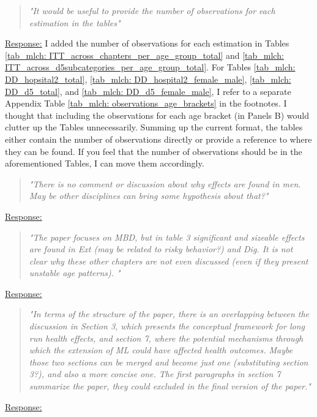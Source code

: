 \begin{quote}
	\textit{"It  would be useful to provide the number of observations for each estimation in the tables"}
\end{quote}
\underline{Response:} I added the number of observations for each estimation in Tables \ref{tab_mlch: ITT_across_chapters_per_age_group_total} and \ref{tab_mlch: ITT_across_d5subcategories_per_age_group_total}. For Tables \ref{tab_mlch: DD_hopsital2_total}, \ref{tab_mlch: DD_hospital2_female_male}, \ref{tab_mlch: DD_d5_total}, and \ref{tab_mlch: DD_d5_female_male}, I refer to a separate Appendix Table \ref{tab_mlch: observations_age_brackets} in the footnotes. I thought that including the observations for each age bracket (in Panels B) would clutter up the Tables unnecessarily. Summing up the current format, the tables either contain the number of observations directly or provide a reference to where they can be found. If you feel that the number of observations should be in the aforementioned Tables, I can move them accordingly.




% 
\begin{quote}
	\textit{"There is no comment or discussion about why effects are found in men. May be other disciplines can bring some hypothesis about that?"}
\end{quote}
\underline{Response:}

% 
\begin{quote}
	\textit{"The paper focuses on MBD, but in table 3 significant and sizeable effects are found in Ext (may be related to risky behavior?) and Dig. It is not clear why these other chapters are not even discussed (even if they present unstable age patterns). "}
\end{quote}
\underline{Response:}

\begin{quote}
	\textit{"In terms of the structure of the paper, there is an overlapping between the discussion in Section 3, which presents the conceptual framework for long run health effects, and section 7, where the potential mechanisms through which the extension of ML could have affected health outcomes. Maybe those two sections can be merged and become just one (substituting section 3?), and also a more concise one. The first paragraphs in section 7 summarize the paper, they could excluded in the final version of the paper."}
\end{quote}
\underline{Response:}
